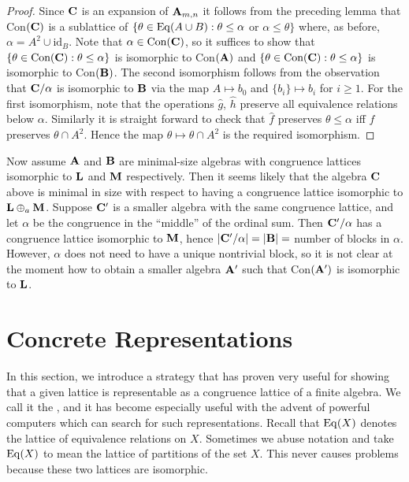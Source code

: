 \begin{proof}
  Since $\mathbf C$ is an expansion of $\mathbf A_{m,n}$ it follows from the preceding lemma
  that Con$(\mathbf C)$ is a sublattice of 
  $\{\theta\in \operatorname{Eq}(A\cup B):\theta\le\alpha$ or $\alpha\le\theta\}$ where,
  as before, $\alpha=A^2\cup\text{id}_B$. Note that $\alpha\in\text{Con}(\mathbf C)$,
  so it suffices to show that $\{\theta\in\text{Con}(\mathbf C):\theta\le\alpha\}$ is
  isomorphic to Con$(\mathbf A)$ and $\{\theta\in\text{Con}(\mathbf C):\theta\le\alpha\}$ 
  is isomorphic to Con$(\mathbf B)$. The second isomorphism follows from the
  observation that $\mathbf C/\alpha$ is isomorphic to $\mathbf B$ via the map 
  $A\mapsto b_0$ and $\{b_i\}\mapsto b_i$ for $i\ge 1$. For the first isomorphism,
  note that the operations $\hat g$, $\hat h$ preserve all equivalence relations
  below $\alpha$. Similarly it is straight forward to check that $\hat f$
  preserves $\theta\le\alpha$ iff $f$ preserves $\theta\cap A^2$. 
  Hence the map $\theta\mapsto\theta\cap A^2$ is the required isomorphism.
\end{proof}

Now assume $\mathbf A$ and $\mathbf B$ are minimal-size algebras with congruence lattices
isomorphic to $\mathbf L$ and $\mathbf M$ respectively. Then it seems likely that the
algebra $\mathbf C$ above is minimal in size with respect to having a congruence
lattice isomorphic to $\mathbf L\oplus_a\mathbf M$. Suppose $\mathbf C'$ is a smaller algebra
with the same congruence lattice, and let $\alpha$ be the congruence in the
``middle'' of the ordinal sum. Then $\mathbf C'/\alpha$ has a congruence lattice
isomorphic to $\mathbf M$, hence $|\mathbf C'/\alpha|=|\mathbf B|=$ number of blocks in
$\alpha$. However, $\alpha$ does not need to have a unique nontrivial block, so
it is not clear at the moment how to obtain a smaller algebra $\mathbf A'$ such that
Con$(\mathbf A')$ is isomorphic to $\mathbf L$. 



\section{Concrete Representations}
\label{sec:concr-repr}

In this section, we introduce a strategy that has proven very useful for showing
that a given lattice is representable as a congruence lattice of a finite
algebra. We call it the , and it has become especially
useful with the advent of powerful computers which can search for such
representations.  Recall that  $\operatorname{Eq}(X)$ denotes the lattice of equivalence
relations on $X$. Sometimes we abuse notation and take $\operatorname{Eq}(X)$ to mean the
lattice of partitions of the set $X$. This never causes problems because these
two lattices are isomorphic.  

